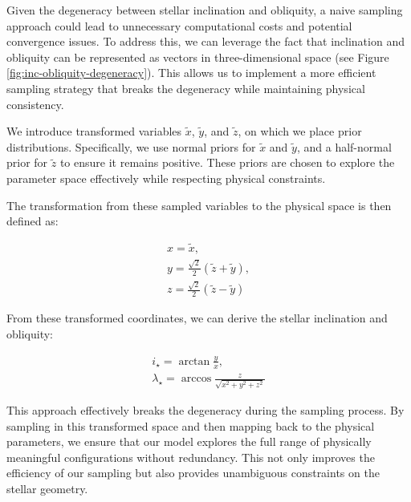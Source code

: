\documentclass[twocolumn]{aastex631}
\begin{document}
Given the degeneracy between stellar inclination and obliquity, a naive sampling approach could lead to unnecessary computational costs and potential 
convergence issues. To address this, we can leverage the fact that inclination and obliquity can be represented as vectors in three-dimensional 
space (see Figure \ref{fig:inc-obliquity-degeneracy}). This allows us to implement a more efficient sampling strategy that breaks the degeneracy 
while maintaining physical consistency.

We introduce transformed variables $\tilde{x}$, $\tilde{y}$, and $\tilde{z}$, on which we place prior distributions. 
Specifically, we use normal priors for $\tilde{x}$ and $\tilde{y}$, and a half-normal prior for $\tilde{z}$ to ensure it remains positive. 
These priors are chosen to explore the parameter space effectively while respecting physical constraints.

The transformation from these sampled variables to the physical space is then defined as:
\begin{linenomath}\begin{align}
    \label{eq:xyz}
    x = \tilde{x}, \\ 
    y = \frac{\sqrt{2}}{2} (\tilde{z} + \tilde{y}), \\
    z = \frac{\sqrt{2}}{2} (\tilde{z} - \tilde{y})
\end{align}\end{linenomath}

From these transformed coordinates, we can derive the stellar inclination and obliquity:

\begin{linenomath}\begin{align}
    \label{eq:obl-inc}
    i_\star = \arctan{\frac{y}{x}}, \\ 
    \lambda_\star = \arccos{\frac{z}{\sqrt{x^2 + y^2 + z^2}}}
\end{align}\end{linenomath}

This approach effectively breaks the degeneracy during the sampling process. By sampling in this transformed space and then mapping back to 
the physical parameters, we ensure that our model explores the full range of physically meaningful configurations without redundancy. 
This not only improves the efficiency of our sampling but also provides unambiguous constraints on the stellar geometry.

\end{document}
